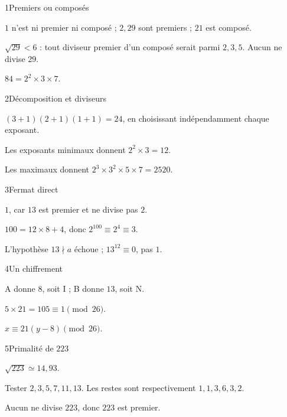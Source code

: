 \begin{corrige}{1}{Premiers ou composés}
\begin{questions}
\item $1$ n’est ni premier ni composé ; $2,29$ sont premiers ; $21$ est composé.
\item $\sqrt{29}<6$ : tout diviseur premier d’un composé serait parmi $2,3,5$. Aucun ne divise $29$.
\item $84=2^2\times3\times7$.
\end{questions}
\end{corrige}
\begin{corrige}{2}{Décomposition et diviseurs}
\begin{questions}
\item $(3+1)(2+1)(1+1)=24$, en choisissant indépendamment chaque exposant.
\item Les exposants minimaux donnent $2^2\times3=12$.
\item Les maximaux donnent $2^3\times3^2\times5\times7=2520$.
\end{questions}
\end{corrige}
\begin{corrige}{3}{Fermat direct}
\begin{questions}
\item $1$, car $13$ est premier et ne divise pas $2$.
\item $100=12\times8+4$, donc $2^{100}\equiv2^4\equiv3$.
\item L’hypothèse $13\nmid a$ échoue ; $13^{12}\equiv0$, pas $1$.
\end{questions}
\end{corrige}
\begin{corrige}{4}{Un chiffrement}
\begin{questions}
\item A donne $8$, soit I ; B donne $13$, soit N.
\item $5\times21=105\equiv1\pmod{26}$.
\item $x\equiv21(y-8)\pmod{26}$.
\end{questions}
\end{corrige}
\begin{corrige}{5}{Primalité de $223$}
\begin{questions}
\item $\sqrt{223}\simeq14{,}93$.
\item Tester $2,3,5,7,11,13$. Les restes sont respectivement $1,1,3,6,3,2$.
\item Aucun ne divise $223$, donc $223$ est premier.
\end{questions}
\end{corrige}
